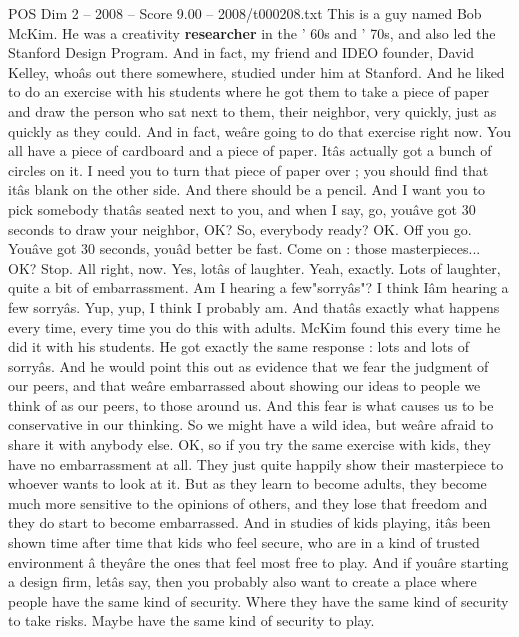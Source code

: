 \begin{textsample}{POS Dim 2 – 2008 – Score 9.00 – 2008/t000208.txt}  \label{ex:f2_pos_074}
This is a guy named Bob McKim.
He was a creativity \textbf{researcher} in the ' 60s and ' 70s, and also led the Stanford Design Program.
And in fact, my friend and IDEO founder, David Kelley, whoâs out there somewhere, studied under him at Stanford.
And he liked to do an exercise with his students where he got them to take a piece of paper and draw the person who sat next to them, their neighbor, very quickly, just as quickly as they could.
And in fact, weâre going to do that exercise right now.
You all have a piece of cardboard and a piece of paper.
Itâs actually got a bunch of circles on it.
I need you to turn that piece of paper over ; you should find that itâs blank on the other side.
And there should be a pencil.
And I want you to pick somebody thatâs seated next to you, and when I say, go, youâve got 30 seconds to draw your neighbor, OK?
So, everybody ready?
OK.
Off you go.
Youâve got 30 seconds, youâd better be fast.
Come on : those masterpieces...
OK?
Stop.
All right, now.
Yes, lotâs of laughter.
Yeah, exactly.
Lots of laughter, quite a bit of embarrassment.
Am I hearing a few"sorryâs"?
I think Iâm hearing a few sorryâs.
Yup, yup, I think I probably am.
And thatâs exactly what happens every time, every time you do this with adults.
McKim found this every time he did it with his students.
He got exactly the same response : lots and lots of sorryâs.
And he would point this out as evidence that we fear the judgment of our peers, and that weâre embarrassed about showing our ideas to people we think of as our peers, to those around us.
And this fear is what causes us to be conservative in our thinking.
So we might have a wild idea, but weâre afraid to share it with anybody else.
OK, so if you try the same exercise with kids, they have no embarrassment at all.
They just quite happily show their masterpiece to whoever wants to look at it.
But as they learn to become adults, they become much more sensitive to the opinions of others, and they lose that freedom and they do start to become embarrassed.
And in studies of kids playing, itâs been shown time after time that kids who feel secure, who are in a kind of trusted environment â theyâre the ones that feel most free to play.
And if youâre starting a design firm, letâs say, then you probably also want to create a place where people have the same kind of security.
Where they have the same kind of security to take risks.
Maybe have the same kind of security to play.

\end{textsample}
